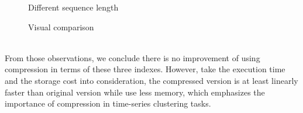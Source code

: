 \begin{figure}[!htbp]
    \centering 
    \caption{ Different sequence length} 
    \label{fig:comparison1} 
\end{figure} 
\begin{figure}[!htbp]
    \centering 
    \caption{ Visual comparison } 
    \label{fig:pippaavisul} 
\end{figure} 
\\From those observations, we conclude there is no improvement of using compression in terms of these three indexes. However, take the execution time and the storage cost into consideration, the compressed version is at least linearly faster than original version while use less memory, which emphasizes the importance of compression in time-series clustering tasks. 